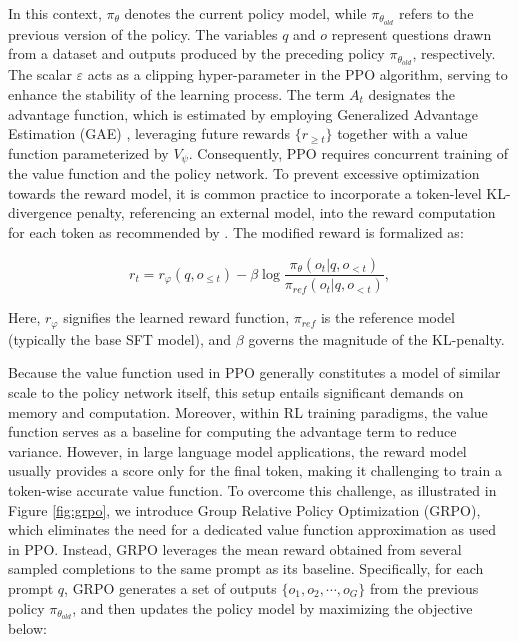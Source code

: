 \begin{itemize}[topsep=0pt]
In this context, $\pi_{\theta}$ denotes the current policy model, while $\pi_{\theta_{old}}$ refers to the previous version of the policy. The variables $q$ and $o$ represent questions drawn from a dataset and outputs produced by the preceding policy $\pi_{\theta_{old}}$, respectively. The scalar $\varepsilon$ acts as a clipping hyper-parameter in the PPO algorithm, serving to enhance the stability of the learning process. The term $A_t$ designates the advantage function, which is estimated by employing Generalized Advantage Estimation (GAE) \citep{gae}, leveraging future rewards $\{r_{\ge t}\}$ together with a value function parameterized by $V_{\psi}$. Consequently, PPO requires concurrent training of the value function and the policy network. To prevent excessive optimization towards the reward model, it is common practice to incorporate a token-level KL-divergence penalty, referencing an external model, into the reward computation for each token as recommended by \citep{ouyang2022training}. The modified reward is formalized as:

\begin{equation}
    r_{t} = r_\varphi(q, o_{\le t}) - \beta \log\frac{\pi_{\theta}(o_{t}|q, o_{<t})}{\pi_{ref}(o_{t}|q, o_{<t})},
\label{eq:PPO-reward}
\end{equation}

Here, $r_\varphi$ signifies the learned reward function, $\pi_{ref}$ is the reference model (typically the base SFT model), and $\beta$ governs the magnitude of the KL-penalty.

Because the value function used in PPO generally constitutes a model of similar scale to the policy network itself, this setup entails significant demands on memory and computation. Moreover, within RL training paradigms, the value function serves as a baseline for computing the advantage term to reduce variance. However, in large language model applications, the reward model usually provides a score only for the final token, making it challenging to train a token-wise accurate value function. To overcome this challenge, as illustrated in Figure \ref{fig:grpo}, we introduce Group Relative Policy Optimization (GRPO), which eliminates the need for a dedicated value function approximation as used in PPO. Instead, GRPO leverages the mean reward obtained from several sampled completions to the same prompt as its baseline. Specifically, for each prompt $q$, GRPO generates a set of outputs $\{o_1, o_2, \cdots, o_G\}$ from the previous policy $\pi_{\theta_{old}}$, and then updates the policy model by maximizing the objective below:


\end{itemize}

